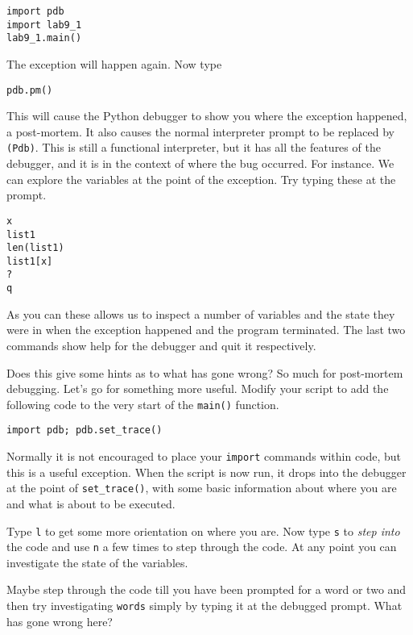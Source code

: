 \documentclass[12pt,oneside]{cttutorial}
\begin{document}
\begin{lstlisting}
import pdb
import lab9_1
lab9_1.main()
\end{lstlisting}

The exception will happen again. Now type

\begin{lstlisting}
pdb.pm()
\end{lstlisting}

This will cause the Python debugger to show you where the exception happened, a post-mortem. It also causes the normal interpreter prompt to be replaced by \lstinline!(Pdb)!. This is still a functional interpreter, but it has all the features of the debugger, and it is in the context of where the bug occurred. For instance. We can explore the variables at the point of the exception. Try typing these at the prompt.

\begin{lstlisting}
x
list1
len(list1)
list1[x]
?
q
\end{lstlisting}

As you can these allows us to inspect a number of variables and the state they were in when the exception happened and the program terminated. The last two commands show help for the debugger and quit it respectively.

Does this give some hints as to what has gone wrong? So much for post-mortem debugging. Let's go for something more useful. Modify your script to add the following code to the very start of the \lstinline!main()! function.

\begin{lstlisting}
import pdb; pdb.set_trace()
\end{lstlisting}

Normally it is not encouraged to place your \lstinline!import! commands within code, but this is a useful exception. When the script is now run, it drops into the debugger at the point of \lstinline!set_trace()!, with some basic information about where you are and what is about to be executed.

Type \lstinline!l! to get some more orientation on where you are. Now type \lstinline!s! to \emph{step into} the code and use \lstinline!n! a few times to step through the code. At any point you can investigate the state of the variables.

Maybe step through the code till you have been prompted for a word or two and then try investigating \lstinline!words! simply by typing it at the debugged prompt. What has gone wrong here?
\end{document}
